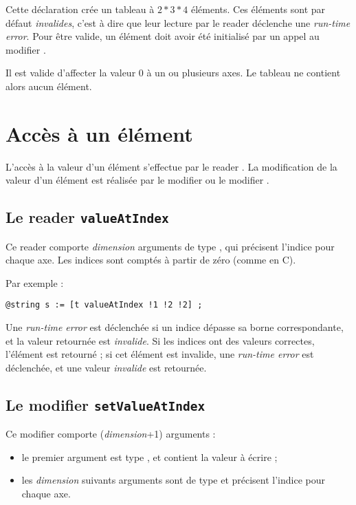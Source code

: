 Cette déclaration crée un tableau à $2*3*4$ éléments. Ces éléments sont par défaut \emph{invalides}, c'est à dire que leur lecture par le reader  déclenche une \emph{run-time error}. Pour être valide, un élément doit avoir été initialisé par un appel au modifier .

Il est valide d'affecter la valeur $0$ à un ou plusieurs axes. Le tableau ne contient alors aucun élément.


\section{Accès à un élément}

L'accès à la valeur d'un élément s'effectue par le reader . La modification de la valeur d'un élément est réalisée par le modifier  ou le modifier .

\subsection{Le reader \texttt{valueAtIndex}}

Ce reader comporte \emph{dimension} arguments de type , qui précisent l'indice pour chaque axe. Les indices sont comptés à partir de zéro (comme en C).

Par exemple :
\begin{lstlisting}[language=galgas]
  @string s := [t valueAtIndex !1 !2 !2] ;
\end{lstlisting}


Une \emph{run-time error} est déclenchée si un indice dépasse sa borne correspondante, et la valeur retournée est \emph{invalide}. Si les indices ont des valeurs correctes, l'élément est retourné ; si cet élément est invalide, une \emph{run-time error} est déclenchée, et une valeur \emph{invalide} est retournée.






\subsection{Le modifier \texttt{setValueAtIndex}}

Ce modifier comporte (\emph{dimension}+1) arguments :
\begin{itemize}
  \item le premier argument est type , et contient la valeur à écrire ;
  \item les \emph{dimension} suivants arguments sont de type  et précisent l'indice pour chaque axe.
\end{itemize} 
  
